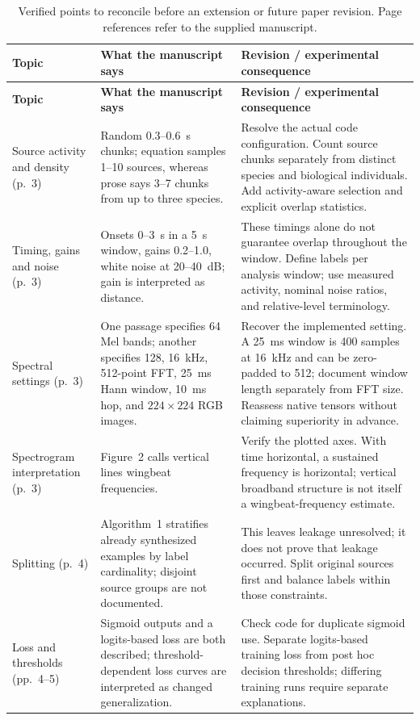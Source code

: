 \documentclass[a4paper,11pt]{article}
\begin{document}
\begin{small}
\begin{longtable}{P{3.15cm}P{6.0cm}P{6.75cm}}
\caption{Verified points to reconcile before an extension or future paper revision. Page references refer to the supplied manuscript.}\label{tab:prior}\\
\toprule\textbf{Topic} & \textbf{What the manuscript says} & \textbf{Revision / experimental consequence}\\\midrule
\endfirsthead
\toprule\textbf{Topic} & \textbf{What the manuscript says} & \textbf{Revision / experimental consequence}\\\midrule
\endhead
Source activity and density (p.~3) & Random 0.3--0.6~s chunks; equation samples 1--10 sources, whereas prose says 3--7 chunks from up to three species. & Resolve the actual code configuration. Count source chunks separately from distinct species and biological individuals. Add activity-aware selection and explicit overlap statistics.\\
Timing, gains and noise (p.~3) & Onsets 0--3~s in a 5~s window, gains 0.2--1.0, white noise at 20--40~dB; gain is interpreted as distance. & These timings alone do not guarantee overlap throughout the window. Define labels per analysis window; use measured activity, nominal noise ratios, and relative-level terminology.\\
Spectral settings (p.~3) & One passage specifies 64 Mel bands; another specifies 128, 16~kHz, 512-point FFT, 25~ms Hann window, 10~ms hop, and $224\times224$ RGB images. & Recover the implemented setting. A 25~ms window is 400 samples at 16~kHz and can be zero-padded to 512; document window length separately from FFT size. Reassess native tensors without claiming superiority in advance.\\
Spectrogram interpretation (p.~3) & Figure~2 calls vertical lines wingbeat frequencies. & Verify the plotted axes. With time horizontal, a sustained frequency is horizontal; vertical broadband structure is not itself a wingbeat-frequency estimate.\\
Splitting (p.~4) & Algorithm~1 stratifies already synthesized examples by label cardinality; disjoint source groups are not documented. & This leaves leakage unresolved; it does not prove that leakage occurred. Split original sources first and balance labels within those constraints.\\
Loss and thresholds (pp.~4--5) & Sigmoid outputs and a logits-based loss are both described; threshold-dependent loss curves are interpreted as changed generalization. & Check code for duplicate sigmoid use. Separate logits-based training loss from post hoc decision thresholds; differing training runs require separate explanations.\\

\end{longtable}
\end{small}
\end{document}
